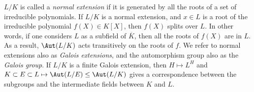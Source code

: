  $L/K$ is called a \emph{normal extension} if it is generated by all the roots of a set of irreducible polynomials.
 If $L/K$ is a normal extension, and $x \in L$ is a root of the irreducible polynomial $f(X) \in K[X]$, then $f(X)$ splits over $L$. In other words, if one considers $L$ as a subfield of $\overline{K}$, then all the roots of $f(X)$ are in $L$. As a result, $\Aut(L/K)$ acts transitively on the roots of $f$.
 We refer to normal extensions also as \emph{Galois extensions}, and the automorphism group also as the \emph{Galois group}.
 If $L/K$ is a finite Galois extension, then $H \mapsto L^H$ and $K \subset E \subset L \mapsto \Aut(L/E) \le \Aut(L/K)$ gives a correspondence between the subgroups and the intermediate fields between $K$ and $L$.